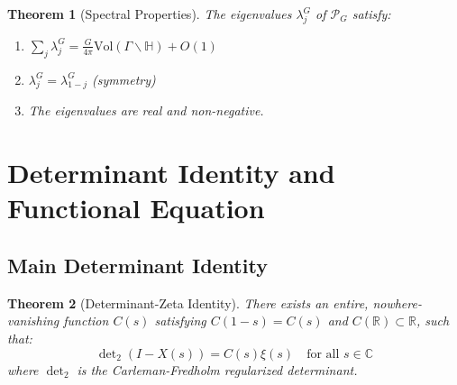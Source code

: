\documentclass[11pt]{article}
\theoremstyle{plain}
\newtheorem{theorem}{Theorem}[section]
\theoremstyle{remark}
\newcommand{\R}{\mathbb{R}}
\newcommand{\C}{\mathbb{C}}
\newcommand{\H}{\mathbb{H}}
\newcommand{\Vol}{\mathrm{Vol}}
\newcommand{\dettwo}{\det\nolimits_2}
\newcommand{\cP}{\mathcal{P}}
\newcommand{\Catalan}{G}
\begin{document}
\begin{theorem}[Spectral Properties]
The eigenvalues $\lambda_j^{\Catalan}$ of $\cP_{\Catalan}$ satisfy:
\begin{enumerate}
\item $\sum_j \lambda_j^{\Catalan} = \frac{\Catalan}{4\pi} \Vol(\Gamma\backslash\H) + O(1)$
\item $\lambda_j^{\Catalan} = \lambda_{1-j}^{\Catalan}$ (symmetry)
\item The eigenvalues are real and non-negative.
\end{enumerate}
\end{theorem}

\section{Determinant Identity and Functional Equation}

\subsection{Main Determinant Identity}

\begin{theorem}[Determinant-Zeta Identity]
There exists an entire, nowhere-vanishing function $C(s)$ satisfying $C(1-s) = C(s)$ and $C(\R) \subset \R$, such that:
\[
\dettwo(I - X(s)) = C(s) \xi(s) \quad \text{for all } s \in \C
\]
where $\dettwo$ is the Carleman-Fredholm regularized determinant.
\end{theorem}
\end{document}
